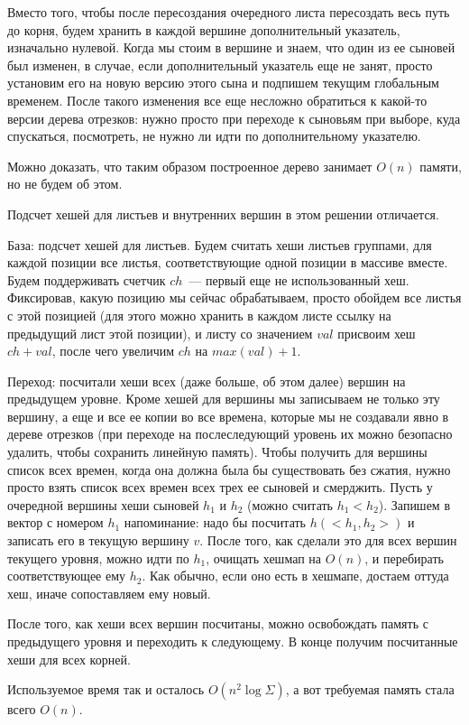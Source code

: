 Вместо того, чтобы после пересоздания очередного листа пересоздать весь путь до корня, будем хранить в каждой вершине дополнительный указатель, изначально нулевой. Когда мы стоим в вершине и знаем, что один из ее сыновей был изменен, в случае, если дополнительный указатель еще не занят, просто установим его на новую версию этого сына и подпишем текущим глобальным временем. После такого изменения все еще несложно обратиться к какой-то версии дерева отрезков: нужно просто при переходе к сыновьям при выборе, куда спускаться, посмотреть, не нужно ли идти по дополнительному указателю.

Можно доказать, что таким образом построенное дерево занимает $O(n)$ памяти, но не будем об этом.

Подсчет хешей для листьев и внутренних вершин в этом решении отличается.

База: подсчет хешей для листьев. Будем считать хеши листьев группами, для каждой позиции все листья, соответствующие одной позиции в массиве вместе. Будем поддерживать счетчик $ch$~--- первый еще не использованный хеш. Фиксировав, какую позицию мы сейчас обрабатываем, просто обойдем все листья с этой позицией (для этого можно хранить в каждом листе ссылку на предыдущий лист этой позиции), и листу со значением $val$ присвоим хеш $ch+val$, после чего увеличим $ch$ на $max(val)+1$.

Переход: посчитали хеши всех (даже больше, об этом далее) вершин на предыдущем уровне. Кроме хешей для вершины мы записываем не только эту вершину, а еще и все ее копии во все времена, которые мы не создавали явно в дереве отрезков (при переходе на послеследующий уровень их можно безопасно удалить, чтобы сохранить линейную память). Чтобы получить для вершины список всех времен, когда она должна была бы существовать без сжатия, нужно просто взять список всех времен всех трех ее сыновей и смерджить. Пусть у очередной вершины хеши сыновей $h_1$ и $h_2$ (можно считать $h_1 < h_2$). Запишем в вектор с номером $h_1$ напоминание: надо бы посчитать $h(<h_1, h_2>)$ и записать его в текущую вершину $v$. После того, как сделали это для всех вершин текущего уровня, можно идти по $h_1$, очищать хешмап на $O(n)$, и перебирать соответствующее ему $h_2$. Как обычно, если оно есть в хешмапе, достаем оттуда хеш, иначе сопоставляем ему новый. 

После того, как хеши всех вершин посчитаны, можно освобождать память с предыдущего уровня и переходить к следующему. В конце получим посчитанные хеши для всех корней.

Используемое время так и осталось $O(n^2 \log \Sigma)$, а вот требуемая память стала всего $O(n)$.


